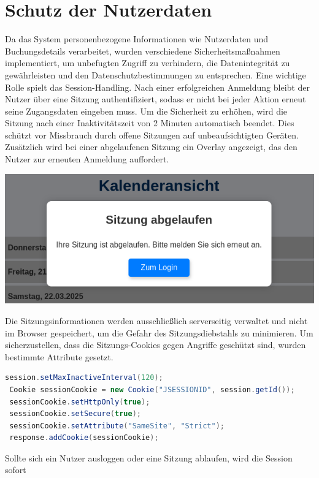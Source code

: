 \section*{Schutz der Nutzerdaten}
Da das System personenbezogene Informationen wie Nutzerdaten und Buchungsdetails 
verarbeitet, wurden verschiedene Sicherheitsmaßnahmen implementiert, um unbefugten 
Zugriff zu verhindern, die Datenintegrität zu gewährleisten und den 
Datenschutzbestimmungen zu entsprechen.
Eine wichtige Rolle spielt das Session-Handling. Nach einer erfolgreichen Anmeldung 
bleibt der Nutzer über eine Sitzung authentifiziert, sodass er nicht bei jeder Aktion 
erneut seine Zugangsdaten eingeben muss. Um die Sicherheit zu erhöhen, wird die Sitzung 
nach einer Inaktivitätszeit von 2 Minuten automatisch beendet. Dies schützt vor 
Missbrauch durch offene Sitzungen auf unbeaufsichtigten Geräten.
Zusätzlich wird bei einer abgelaufenen Sitzung ein Overlay angezeigt, das den Nutzer zur 
erneuten Anmeldung auffordert. 
\begin{center}
  \includegraphics[width=0.95\linewidth, height=0.45\textheight, keepaspectratio]{src/abbildungen/session.png}
\end{center}
Die Sitzungsinformationen werden ausschließlich 
serverseitig verwaltet und nicht im Browser gespeichert, um die Gefahr des 
Sitzungsdiebstahls zu minimieren. Um sicherzustellen, dass die Sitzungs-Cookies gegen 
Angriffe geschützt sind, wurden bestimmte Attribute gesetzt.
\vspace{0.5cm}
\begin{lstlisting}[language=java, caption={Cookie-Attribute}, captionpos=b]
 session.setMaxInactiveInterval(120);
 Cookie sessionCookie = new Cookie("JSESSIONID", session.getId());
 sessionCookie.setHttpOnly(true);
 sessionCookie.setSecure(true); 
 sessionCookie.setAttribute("SameSite", "Strict"); 
 response.addCookie(sessionCookie);
\end{lstlisting}
Sollte sich ein Nutzer ausloggen oder eine Sitzung ablaufen, wird die Session sofort 
